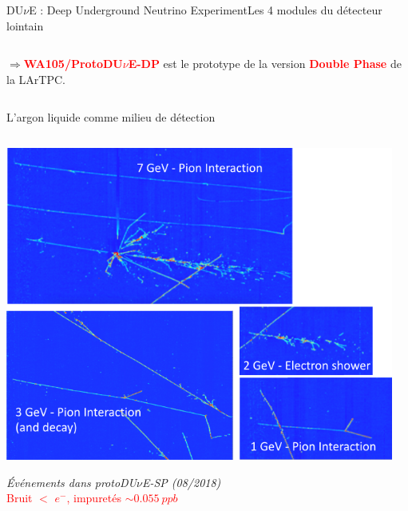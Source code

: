 \begin{frame}{DU$\nu$E : Deep Underground Neutrino Experiment}{Les 4 modules du détecteur lointain}
\begin{scriptsize}
\begin{columns}
\begin{column}{0.45\textwidth}
                    $\Rightarrow$\textcolor{red}{\textbf{WA105/ProtoDU$\nu$E-DP}} est le prototype de la version \textcolor{red}{\textbf{Double Phase}} de la LArTPC.\\
                \end{column}
            \end{columns}
        \end{scriptsize}
    \end{frame}
                
    \begin{frame}{L'argon liquide comme milieu de détection}
        \begin{scriptsize}
           	\begin{columns}
           		\begin{column}{0.6\textwidth}
           			\centering
           			\includegraphics[width=\textwidth]{./pictures/SP_evt.png}\\
           			\flushleft
           			\begin{footnotesize}\textit{Événements dans protoDU$\nu$E-SP (08/2018)}\\
           			\textcolor{red}{Bruit $<$  $e^{-}$, impuretés $\sim\SI{0.055}{ppb}$}\end{footnotesize}
           		\end{column}
           		\begin{column}{0.4\textwidth}
           			\begin{footnotesize}

\end{footnotesize}
\end{column}
\end{columns}
\end{scriptsize}
\end{frame}
